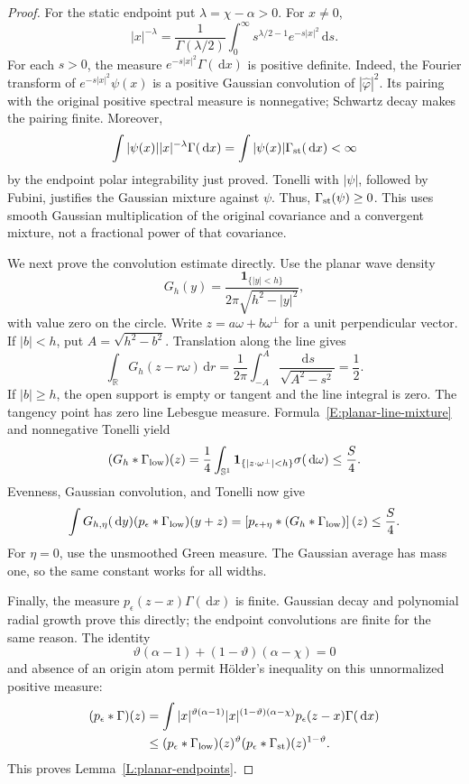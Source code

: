 \documentclass[12pt]{article}
\numberwithin{equation}{section}
\theoremstyle{definition}
\newcommand{\R}{\mathbb{R}}
\newcommand{\ud}{\,\mathrm{d}}
\begin{document}
\begin{proof}
  For the static endpoint put $\lambda=\chi-\alpha>0$. For $x\ne0$,
  \[
    |x|^{-\lambda}=\frac1{\Gamma(\lambda/2)}
    \int_0^\infty s^{\lambda/2-1}e^{-s|x|^2}\ud s.
  \]
  For each $s>0$, the measure $e^{-s|x|^2}\Gamma(\ud x)$ is
  positive definite. Indeed, the Fourier transform of
  $e^{-s|x|^2}\psi(x)$ is a positive Gaussian convolution of
  $|\widehat{\varphi}|^2$. Its pairing with the original positive
  spectral measure is nonnegative; Schwartz decay makes the pairing
  finite. Moreover,
  \[
    \int |\psi(x)||x|^{-\lambda}\Gamma(\ud x)
    =\int |\psi(x)|\Gamma_{\rm st}(\ud x)<\infty
  \]
  by the endpoint polar integrability just proved. Tonelli with
  $|\psi|$, followed by Fubini, justifies the Gaussian mixture against
  $\psi$. Thus, $\Gamma_{\rm st}(\psi)\ge0$. This uses smooth
  Gaussian multiplication of the original covariance and a convergent
  mixture, not a fractional power of that covariance.

  We next prove the convolution estimate directly. Use the planar wave
  density
  \[
    G_h(y)=\frac{\mathbf1_{\{|y|<h\}}}{2\pi\sqrt{h^2-|y|^2}},
  \]
  with value zero on the circle. Write
  $z=a\omega+b\omega^\perp$ for a unit perpendicular vector.
  If $|b|<h$, put $A=\sqrt{h^2-b^2}$. Translation along the line gives
  \[
    \int_\R G_h(z-r\omega)\ud r
    =\frac1{2\pi}\int_{-A}^A\frac{\ud s}{\sqrt{A^2-s^2}}
    =\frac12.
  \]
  If $|b|\ge h$, the open support is empty or tangent and the line
  integral is zero. The tangency point has zero line Lebesgue measure.
  Formula~\eqref{E:planar-line-mixture} and nonnegative Tonelli yield
  \[
    (G_h*\Gamma_{\rm low})(z)
    =\frac14\int_{\mathbb{S}^1}
    \mathbf1_{\{|z\cdot\omega^\perp|<h\}}\sigma(\ud\omega)
    \le\frac S4.
  \]
  Evenness, Gaussian convolution, and Tonelli now give
  \[
    \int G_{h,\eta}(\ud y)(p_\epsilon*\Gamma_{\rm low})(y+z)
    =\left[p_{\epsilon+\eta}*(G_h*\Gamma_{\rm low})\right](z)
    \le\frac S4.
  \]
  For $\eta=0$, use the unsmoothed Green measure. The Gaussian average
  has mass one, so the same constant works for all widths.

  Finally, the measure $p_\epsilon(z-x)\Gamma(\ud x)$ is finite.
  Gaussian decay and polynomial radial growth prove this directly;
  the endpoint convolutions are finite for the same reason. The identity
  \[
    \vartheta(\alpha-1)+(1-\vartheta)(\alpha-\chi)=0
  \]
  and absence of an origin atom permit H\"older's inequality on this
  unnormalized positive measure:
  \[
    \begin{split}
      (p_\epsilon*\Gamma)(z)
      &=\int |x|^{\vartheta(\alpha-1)}
      |x|^{(1-\vartheta)(\alpha-\chi)}
      p_\epsilon(z-x)\Gamma(\ud x)\\
      &\le(p_\epsilon*\Gamma_{\rm low})(z)^\vartheta
      (p_\epsilon*\Gamma_{\rm st})(z)^{1-\vartheta}.
    \end{split}
  \]
  This proves Lemma~\ref{L:planar-endpoints}.
\end{proof}
\end{document}
